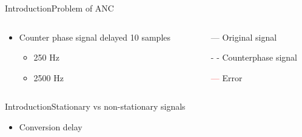\begin{frame}{Introduction}{Problem of ANC}		
	\begin{columns}
		\begin{column}{0.5\textwidth}
			\begin{itemize}
				\item Counter phase signal delayed 10 samples	
				\begin{itemize}
					\item 250 Hz
					\item 2500 Hz 
				\end{itemize}	
			\end{itemize}
			\vspace{8.5mm}			
		\begin{center}
	 		
	 	\end{center}
		\end{column}
		\begin{column}{0.5\textwidth} 
		\begin{itemize}
			\item[\textcolor{MATLABblue}{---}] Original signal
			\item[\textcolor{MATLABblue}{- -}] Counterphase signal
			\item[\textcolor{red}{---}] Error
		\end{itemize}
		\begin{center}
	 		
	 	\end{center}
		\end{column}
	\end{columns}
\end{frame}





\begin{frame}{Introduction}{Stationary vs non-stationary signals}		
	\begin{itemize}
		\item Conversion delay
	\end{itemize}
\end{frame}




